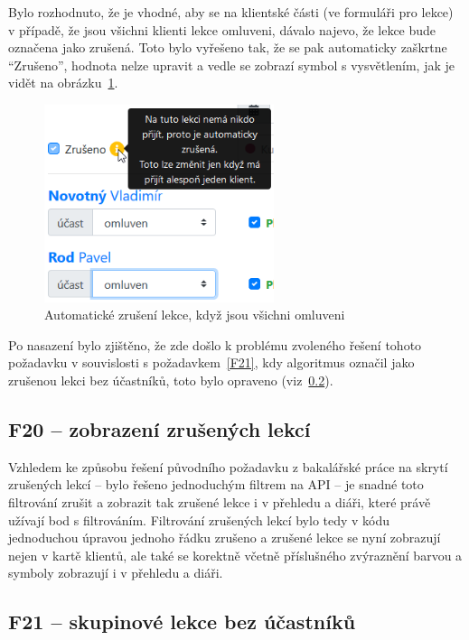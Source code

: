 Bylo rozhodnuto, že je vhodné, aby se na klientské části (ve formuláři pro lekce) v případě, že jsou všichni klienti lekce omluveni, dávalo najevo, že lekce bude označena jako zrušená. Toto bylo vyřešeno tak, že se pak automaticky zaškrtne \enquote{Zrušeno}, hodnota nelze upravit a vedle se zobrazí symbol s vysvětlením, jak je vidět na obrázku~\ref{fig:ui-screen-automatickezruseni}.

\begin{figure}[h]\centering
    \includegraphics[width=0.6\textwidth]{img/ui-screen-automatickezruseni.png}
    \caption{Automatické zrušení lekce, když jsou všichni omluveni}\label{fig:ui-screen-automatickezruseni}
\end{figure}

Po nasazení bylo zjištěno, že zde došlo k problému zvoleného řešení tohoto požadavku v souvislosti s požadavkem~\ref{F21}, kdy algoritmus označil jako zrušenou lekci bez účastníků, toto bylo opraveno (viz~\ref{subsec:F21implementace}).

\subsection{F20 -- zobrazení zrušených lekcí}

Vzhledem ke způsobu řešení původního požadavku z bakalářské práce na skrytí zrušených lekcí -- bylo řešeno jednoduchým filtrem na API -- je snadné toto filtrování zrušit a zobrazit tak zrušené lekce i v přehledu a diáři, které právě užívají bod s filtrováním. Filtrování zrušených lekcí bylo tedy v kódu jednoduchou úpravou jednoho řádku zrušeno a zrušené lekce se nyní zobrazují nejen v kartě klientů, ale také se korektně včetně příslušného zvýraznění barvou a symboly zobrazují i v přehledu a diáři.

\subsection{F21 -- skupinové lekce bez účastníků}\label{subsec:F21implementace}

